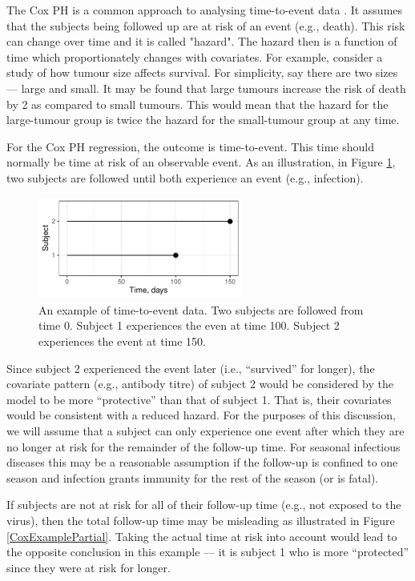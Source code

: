 The Cox PH is a common approach to analysing time-to-event data \cite{George;2014}. It assumes that the subjects being followed up are at risk of an event (e.g., death). This risk can change over time and it is called "hazard". The hazard then is a function of time which proportionately changes with covariates. For example, consider a study of how tumour size affects survival. For simplicity, say there are two sizes --- large and small. It may be found that large tumours increase the risk of death by 2 as compared to small tumours. This would mean that the hazard for the large-tumour group is twice the hazard for the small-tumour group at any time.

For the Cox PH regression, the outcome is time-to-event. This time should normally be time at risk of an observable event. As an illustration, in Figure \ref{CoxExampleFull}, two subjects are followed until both experience an event (e.g., infection).

\begin{figure}[htp]
	\centering
	\includegraphics[width=0.6\textwidth]{../curve-cox/timeplot_1_light.pdf}
	\caption{
	An example of time-to-event data. Two subjects are followed from time 0. Subject 1 experiences the even at time 100. Subject 2 experiences the event at time 150.
	}
	\label{CoxExampleFull}
\end{figure}

Since subject 2 experienced the event later (i.e., ``survived'' for longer), the covariate pattern (e.g., antibody titre) of subject 2 would be considered by the model to be more ``protective'' than that of subject 1. That is, their covariates would be consistent with a reduced hazard. For the purposes of this discussion, we will assume that a subject can only experience one event after which they are no longer at risk for the remainder of the follow-up time. For seasonal infectious diseases this may be a reasonable assumption if the follow-up is confined to one season and infection grants immunity for the rest of the season (or is fatal).

If subjects are not at risk for all of their follow-up time (e.g., not exposed to the virus), then the total follow-up time may be misleading as illustrated in Figure \ref{CoxExamplePartial}. Taking the actual time at risk into account would lead to the opposite conclusion in this example --- it is subject 1 who is more ``protected'' since they were at risk for longer.

